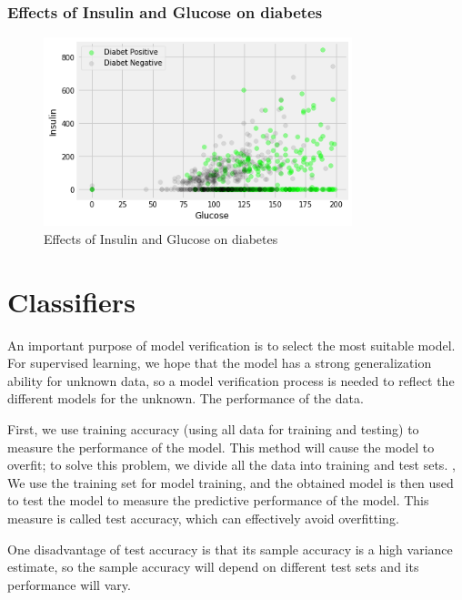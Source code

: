 \documentclass[11pt,en]{elegantpaper}
\begin{document}
\subsubsection{Effects of Insulin and Glucose on diabetes}
\begin{figure}[H]
    \centering
    \includegraphics[width=0.8\textwidth]{figure/f6.png}
    \caption{Effects of Insulin and Glucose on diabetes}
\end{figure}



\section{Classifiers}
An important purpose of model verification is to select the most suitable model. For supervised learning, we hope that the model has a strong generalization ability for unknown data, so a model verification process is needed to reflect the different models for the unknown. The performance of the data.

First, we use training accuracy (using all data for training and testing) to measure the performance of the model. This method will cause the model to overfit; to solve this problem, we divide all the data into training and test sets. , We use the training set for model training, and the obtained model is then used to test the model to measure the predictive performance of the model. This measure is called test accuracy, which can effectively avoid overfitting.

One disadvantage of test accuracy is that its sample accuracy is a high variance estimate, so the sample accuracy will depend on different test sets and its performance will vary.
\end{document}
